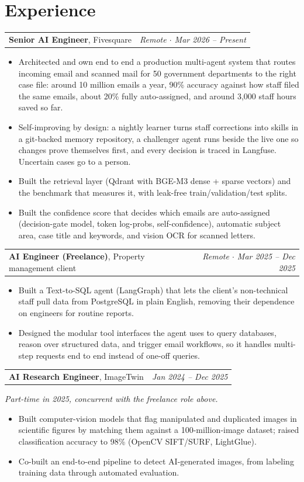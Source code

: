 \documentclass[10pt,a4paper]{article}
\makeatletter
\newcommand{\role}[3]{\par\vspace{3pt}\begin{tabularx}{\linewidth}{@{}X r@{}}\textbf{#1}, #2 & \textit{#3}\end{tabularx}\par}
\makeatother
\begin{document}
\section{Experience}
\role{Senior AI Engineer}{Fivesquare}{Remote $\cdot$ Mar 2026 -- Present}\begin{itemize}
\item Architected and own end to end a production multi-agent system that routes incoming email and scanned mail for 50 government departments to the right case file: around 10 million emails a year, 90\% accuracy against how staff filed the same emails, about 20\% fully auto-assigned, and around 3,000 staff hours saved so far.
\item Self-improving by design: a nightly learner turns staff corrections into skills in a git-backed memory repository, a challenger agent runs beside the live one so changes prove themselves first, and every decision is traced in Langfuse. Uncertain cases go to a person.
\item Built the retrieval layer (Qdrant with BGE-M3 dense + sparse vectors) and the benchmark that measures it, with leak-free train/validation/test splits.
\item Built the confidence score that decides which emails are auto-assigned (decision-gate model, token log-probs, self-confidence), automatic subject area, case title and keywords, and vision OCR for scanned letters.
\end{itemize}
\role{AI Engineer (Freelance)}{Property management client}{Remote $\cdot$ Mar 2025 -- Dec 2025}\begin{itemize}
\item Built a Text-to-SQL agent (LangGraph) that lets the client's non-technical staff pull data from PostgreSQL in plain English, removing their dependence on engineers for routine reports.
\item Designed the modular tool interfaces the agent uses to query databases, reason over structured data, and trigger email workflows, so it handles multi-step requests end to end instead of one-off queries.
\end{itemize}
\role{AI Research Engineer}{ImageTwin}{Jan 2024 -- Dec 2025}{\small\textit{Part-time in 2025, concurrent with the freelance role above.}}\par\vspace{-1pt}\begin{itemize}
\item Built computer-vision models that flag manipulated and duplicated images in scientific figures by matching them against a 100-million-image dataset; raised classification accuracy to 98\% (OpenCV SIFT/SURF, LightGlue).
\item Co-built an end-to-end pipeline to detect AI-generated images, from labeling training data through automated evaluation.
\end{itemize}
\end{document}
